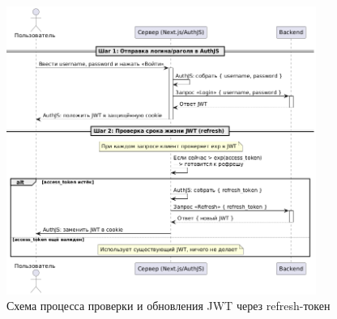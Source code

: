 \begin{figure}[h]
    \centering
    \includegraphics[width=0.9\textwidth]{static/diagrams/AuthRefresh.png}
    \caption{Схема процесса проверки и обновления JWT через refresh-токен}
    \label{fig:auth-refresh}
\end{figure}

